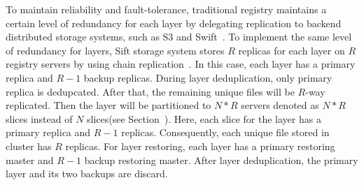 To maintain reliability and fault-tolerance, 
traditional registry maintains a certain level of redundancy for each layer 
by delegating replication to backend
distributed storage systems, such as S3 and Swift~\cite{xxx}.
To implement the same level of redundancy for layers,
Sift storage system stores $R$ replicas for each layer on $R$ registry servers 
by using
chain replication~\cite{xxx}.
In this case, each layer has a primary replica and $R-1$ backup replicas.
During layer deduplication, 
only primary replica is dedupcated.
After that,
the remaining unique files
will be $R$-way replicated.
Then the layer will be
partitioned to $N*R$ servers
denoted as $N*R$ slices instead of $N$ slices(see Section~\cite{xxx}).
Here, each slice for the layer 
has a primary replica and $R-1$ replicas.
Consequently, each unique file stored in cluster
has $R$ replicas.
For layer restoring,
each layer has a primary restoring master and $R-1$ backup restoring master. 
After layer deduplication, 
the primary layer and its two backups are discard.
 

